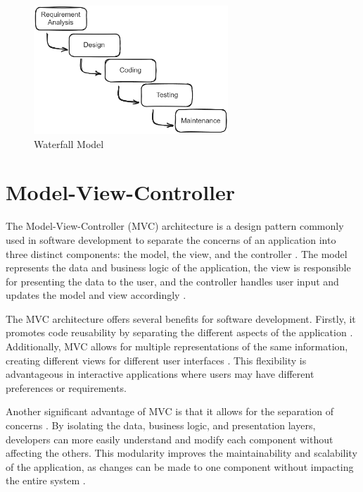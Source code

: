 \begin{figure}[!ht]
    \centering
    \includegraphics[width=0.65\textwidth]{texs/Part2/chapter1/image/waterfall.png}
    \caption{Waterfall Model}
    \label{fig:waterfall-model}
\end{figure}


\section{Model-View-Controller}
\label{sec:model-view-controller}

The Model-View-Controller (MVC) architecture is a design pattern commonly used in software development to separate the concerns of an application into three distinct components: the model, the view, and the controller \cite[47]{Garca2023}. The model represents the data and business logic of the application, the view is responsible for presenting the data to the user, and the controller handles user input and updates the model and view accordingly \cite{sarker14}.

The MVC architecture offers several benefits for software development. Firstly, it promotes code reusability by separating the different aspects of the application \cite{sarker14}. Additionally, MVC allows for multiple representations of the same information, creating different views for different user interfaces \cite{sarker14}. This flexibility is advantageous in interactive applications where users may have different preferences or requirements.

Another significant advantage of MVC is that it allows for the separation of concerns \cite{Stepien}. By isolating the data, business logic, and presentation layers, developers can more easily understand and modify each component without affecting the others. This modularity improves the maintainability and scalability of the application, as changes can be made to one component without impacting the entire system \cite{Kozon_2023}.

